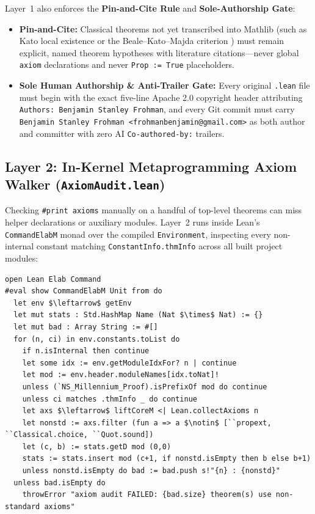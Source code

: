\documentclass[11pt,a4paper]{article}
\theoremstyle{plain}
\theoremstyle{definition}
\begin{document}
Layer~1 also enforces the \textbf{Pin-and-Cite Rule} and \textbf{Sole-Authorship Gate}:
\begin{itemize}[nosep]
  \item \textbf{Pin-and-Cite:} Classical theorems not yet transcribed into Mathlib (such as Kato local existence \cite{kato1984} or the Beale--Kato--Majda criterion \cite{bkm1984}) must remain explicit, named theorem hypotheses with literature citations---never global \texttt{axiom} declarations and never \texttt{Prop := True} placeholders.
  \item \textbf{Sole Human Authorship \& Anti-Trailer Gate:} Every original \texttt{.lean} file must begin with the exact five-line Apache 2.0 copyright header attributing \texttt{Authors: Benjamin Stanley Frohman}, and every Git commit must carry \texttt{Benjamin Stanley Frohman <frohmanbenjamin@gmail.com>} as both author and committer with zero AI \texttt{Co-authored-by:} trailers.
\end{itemize}

\subsection{Layer 2: In-Kernel Metaprogramming Axiom Walker (\texttt{AxiomAudit.lean})}\label{sec:layer2}

Checking \texttt{\#print axioms} manually on a handful of top-level theorems can miss helper declarations or auxiliary modules. Layer~2 runs inside Lean's \texttt{CommandElabM} monad over the compiled \texttt{Environment}, inspecting every non-internal constant matching \texttt{ConstantInfo.thmInfo} across all built project modules:

\begin{lstlisting}[language=Lean4,caption={In-kernel metaprogramming axiom walker (\texttt{AxiomAudit.lean}).}]
open Lean Elab Command
#eval show CommandElabM Unit from do
  let env $\leftarrow$ getEnv
  let mut stats : Std.HashMap Name (Nat $\times$ Nat) := {}
  let mut bad : Array String := #[]
  for (n, ci) in env.constants.toList do
    if n.isInternal then continue
    let some idx := env.getModuleIdxFor? n | continue
    let mod := env.header.moduleNames[idx.toNat]!
    unless (`NS_Millennium_Proof).isPrefixOf mod do continue
    unless ci matches .thmInfo _ do continue
    let axs $\leftarrow$ liftCoreM <| Lean.collectAxioms n
    let nonstd := axs.filter (fun a => a $\notin$ [``propext, ``Classical.choice, ``Quot.sound])
    let (c, b) := stats.getD mod (0,0)
    stats := stats.insert mod (c+1, if nonstd.isEmpty then b else b+1)
    unless nonstd.isEmpty do bad := bad.push s!"{n} : {nonstd}"
  unless bad.isEmpty do
    throwError "axiom audit FAILED: {bad.size} theorem(s) use non-standard axioms"
\end{lstlisting}
\end{document}
